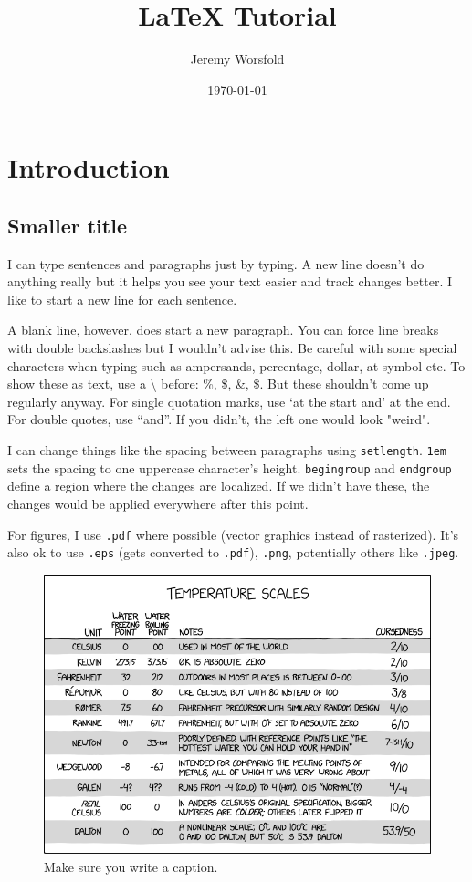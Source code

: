 \documentclass{article} %
\title{LaTeX Tutorial}
\author{Jeremy Worsfold}
\date{\today}
\begin{document}
\maketitle

\section{Introduction} %

\subsection{Smaller title} %

I can type sentences and paragraphs just by typing.
A new line doesn't do anything really but it helps you see your text easier and track changes better.
I like to start a new line for each sentence.

A blank line, however, does start a new paragraph. You can force line breaks with double backslashes but I wouldn't advise this. 
Be careful with some special characters when typing such as ampersands, percentage, dollar, at symbol etc. 
To show these as text, use a \textbackslash\; before: \%, \$, \&, \$. 
But these shouldn't come up regularly anyway.
For single quotation marks, use `at the start and' at the end. For double quotes, use ``and''. 
If you didn't, the left one would look "weird".


\begingroup %

\setlength{\parskip}{1em}
I can change things like the spacing between paragraphs using \texttt{setlength}.
\texttt{1em} sets the spacing to one uppercase character's height. 
\texttt{begingroup} and \texttt{endgroup} define a region where the changes are localized. If we didn't have these, the changes would be applied everywhere after this point.

For figures, I use \texttt{.pdf} where possible (vector graphics instead of rasterized). It's also ok to use \texttt{.eps} (gets converted to \texttt{.pdf}), \texttt{.png}, potentially others like  \texttt{.jpeg}.
\begin{figure}
    \centering
    \includegraphics[width=0.8\linewidth]{temperature_scales.png}
    \caption{Make sure you write a caption.}
    \label{fig:temp-scales}
\end{figure}
\end{document}
